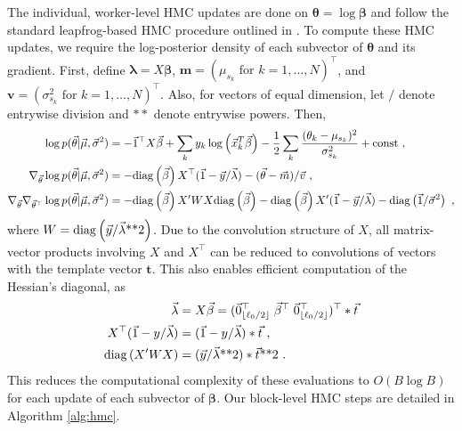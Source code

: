 The individual, worker-level HMC updates are done on $\bm \theta = \log \bm \beta$ and follow the standard leapfrog-based HMC procedure outlined in \citet{Neal2010}.
To compute these HMC updates, we require the log-posterior density of each subvector of $\bm \theta$ and its gradient.
First, define $\bm \lambda = X \bm \beta$, $\bm m = (\mu_{s_k} \mbox{ for } k = 1, \ldots, N)^\top$, and $\bm v = (\sigma^2_{s_k} \mbox{ for } k = 1, \ldots, N)^\top$.
Also, for vectors of equal dimension, let $/$ denote entrywise division and $**$ denote entrywise powers.
Then,
\begin{align}
\log p(\bm \theta | \bm \mu, \bm \sigma^2) &= -\bm 1^\top X \bm \beta + \sum_k y_k \log \left( \bm x_k^T \bm \beta \right) -
  \frac{1}{2} \sum_k \frac{(\theta_k - \mu_{s_k})^2}{\sigma^2_{s_k}}
  + \mathrm{const} \ , \\
\nabla_{\bm \theta} \log p(\bm \theta | \bm \mu, \bm \sigma^2) &= -\diag{\bm \beta} X^\top (\bm 1 - \bm y / \bm \lambda) - (\bm \theta - \bm m) / \bm v \ , \\
\nabla_{\bm \theta} \nabla_{\bm \theta^\top} \log p(\bm \theta | \bm \mu, \bm \sigma^2) &= -\diag{\bm \beta} X'WX \diag{\bm \beta} - \diag{\bm \beta} X' (\bm 1 - \bm y
/ \bm \lambda) - \diag{\bm 1 / \bm \sigma^2} \label{eq:hessian} \ ,
\end{align}
where $W = \mathrm{diag}\left(\vec y / \vec \lambda\mbox{**}2\right)$.
Due to the convolution structure of $X$, all matrix-vector products involving $X$ and $X^\top$ can be reduced to convolutions of vectors with the template vector $\bm t$.
This also enables efficient computation of the Hessian's diagonal, as
\begin{align}
\vec \lambda &= X \vec \beta = (\vec 0_{\lfloor \ell_0 / 2 \rfloor}^\top \; \vec \beta^\top \; \vec 0_{\lfloor \ell_0 / 2 \rfloor}^\top)^\top * \vec t \\
X^\top (\vec 1 - y / \vec \lambda) &= (\vec 1 - y / \vec \lambda) * \vec t \ , \\
\mathrm{diag}\left(X'WX\right) &= (\vec y / \vec \lambda\mbox{**}2) * \vec t\mbox{**}2 \ .
\end{align}
%
This reduces the computational complexity of these evaluations to $O(B \log B)$ for each update of each subvector of $\bm \beta$.
Our block-level HMC steps are detailed in Algorithm \ref{alg:hmc}.
%
